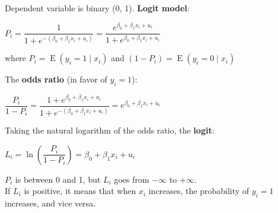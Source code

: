 \documentclass[10pt, a4paper, landscape]{article}
\DeclareMathOperator{\E}{E}
\begin{document}
\begin{multicols}{3}
Dependent variable is binary (0, 1). \textbf{Logit model}:

\begin{center}
	\( P_{i} = \dfrac{1}{1 + e^{-(\beta_{0} + \beta_{1} x_{i} + u_{i})}}= \dfrac{e^{\beta_{0} + \beta_{1} x_{i} + u_{i}}}{1 + e^{\beta_{0} + \beta_{1} x_{i} + u_{i}}} \)
\end{center}

where \( P_{i} = \E(y_{i} = 1 \mid x_{i}) \) and \( (1 - P_{i}) = \E(y_{i} = 0 \mid x_{i}) \)

The \textbf{odds ratio} (in favor of \( y_{i} = 1 \)):

\begin{center}
	\( \dfrac{P_{i}}{1 - P_{i}} = \dfrac{1 + e^{\beta_{0} + \beta_{1} x_{i} + u_{i}}}{1 + e^{-(\beta_{0} + \beta_{1} x_{i} + u_{i})}} = e^{\beta_{0} + \beta_{1} x_{i} + u_{i}} \)
\end{center}

Taking the natural logarithm of the odds ratio, the \textbf{logit}:

\begin{center}
	\( L_{i} = \ln \left( \dfrac{P_i}{1 - P_i}\right) = \beta_{0} + \beta_{1} x_{i} + u_{i} \)
\end{center}

\setlength{\multicolsep}{6pt}
\begin{multicols}{2}

\( P_{i} \) is between 0 and 1, but \( L_{i} \) goes from \( -\infty \) to \( +\infty \). \\

If \( L_{i} \) is positive, it means that when \( x_{i} \) increases, the probability of \( y_{i} = 1 \) increases, and vice versa.

\columnbreak


\end{multicols}


\end{multicols}
\end{document}
